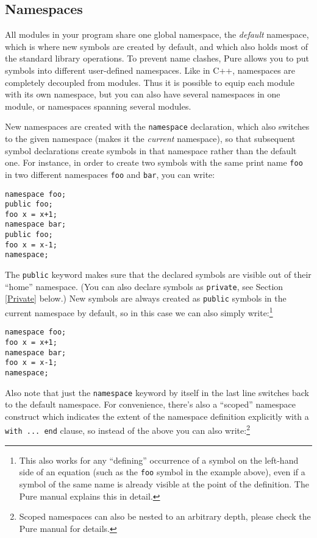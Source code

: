 \documentclass[a4paper,12pt]{article}
\begin{document}
\subsection{Namespaces}
\label{Namespaces}

All modules in your program share one global namespace, the \emph{default} namespace, which is where new symbols are created by default, and which also holds most of the standard library operations. To prevent name clashes, Pure allows you to put symbols into different user-defined namespaces. Like in C++, namespaces are completely decoupled from modules. Thus it is possible to equip each module with its own namespace, but you can also have several namespaces in one module, or namespaces spanning several modules.

New namespaces are created with the \lstinline{namespace} declaration, which also switches to the given namespace (makes it the \emph{current} namespace), so that subsequent symbol declarations create symbols in that namespace rather than the default one. For instance, in order to create two symbols with the same print name \verb|foo| in two different namespaces \verb|foo| and \verb|bar|, you can write:

\begin{lstlisting}
namespace foo;
public foo;
foo x = x+1;
namespace bar;
public foo;
foo x = x-1;
namespace;
\end{lstlisting}

The \lstinline{public} keyword makes sure that the declared symbols are visible out of their ``home'' namespace. (You can also declare symbols as \lstinline{private}, see Section \ref{Private} below.) New symbols are always created as \lstinline{public} symbols in the current namespace by default, so in this case we can also simply write:\footnote{This also works for any ``defining'' occurrence of a symbol on the left-hand side of an equation (such as the \texttt{foo} symbol in the example above), even if a symbol of the same name is already visible at the point of the definition. The Pure manual explains this in detail.}

\begin{lstlisting}
namespace foo;
foo x = x+1;
namespace bar;
foo x = x-1;
namespace;
\end{lstlisting}

Also note that just the \lstinline{namespace} keyword by itself in the last line switches back to the default namespace. For convenience, there's also a ``scoped'' namespace construct which indicates the extent of the namespace definition explicitly with a \lstinline{with ... end} clause, so instead of the above you can also write:\footnote{Scoped namespaces can also be nested to an arbitrary depth, please check the Pure manual for details.}
\end{document}

